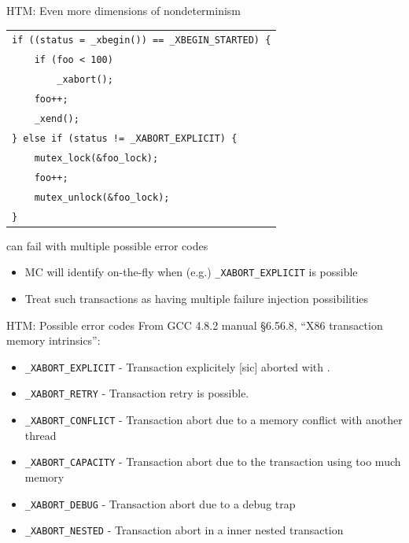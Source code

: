 \documentclass[xcolor=dvipsnames]{beamer}
\begin{document}
\begin{frame}{HTM: Even more dimensions of nondeterminism}
	\begin{center}
		\begin{tabular}{l}
			\texttt{if ((status = \_xbegin()) == \_XBEGIN\_STARTED) \{} \\
			\texttt{~~~~if (foo < 100)}\\
			\texttt{~~~~~~~~\_xabort();} \\
			\texttt{~~~~foo++;} \\
			\texttt{~~~~\_xend();} \\
			\texttt{\} else if (status != \_XABORT\_EXPLICIT) \{} \\
			\texttt{~~~~mutex\_lock(\&foo\_lock);} \\
			\texttt{~~~~foo++;} \\
			\texttt{~~~~mutex\_unlock(\&foo\_lock);} \\
			\texttt{\}} \\
		\end{tabular}
	\end{center}
	\linegap

	\xbegin can fail with multiple possible error codes
	\begin{itemize}
		\item MC will identify on-the-fly when (e.g.) {\tt \_XABORT\_EXPLICIT} is possible
		\item Treat such transactions as having multiple failure injection possibilities
	\end{itemize}
\end{frame}

\begin{frame}{HTM: Possible \xabort error codes}
	From GCC 4.8.2 manual \S 6.56.8, ``X86 transaction memory intrinsics'':
	\begin{itemize}
		\item {\tt \_XABORT\_EXPLICIT} - Transaction explicitely [sic] aborted with \xabort.
		\item {\tt \_XABORT\_RETRY} - Transaction retry is possible.
		\item {\tt \_XABORT\_CONFLICT} - Transaction abort due to a memory conflict with another thread
		\item {\tt \_XABORT\_CAPACITY} - Transaction abort due to the transaction using too much memory
		\item {\tt \_XABORT\_DEBUG} - Transaction abort due to a debug trap
		\item {\tt \_XABORT\_NESTED} - Transaction abort in a inner nested transaction 
	\end{itemize}
\end{frame}
\end{document}
